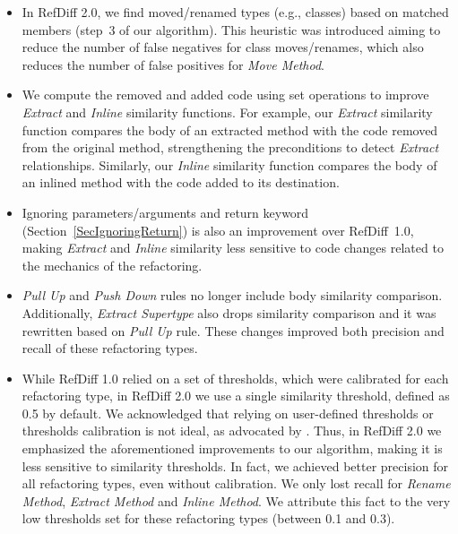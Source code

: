 \begin{itemize}
\item In RefDiff 2.0, we find moved/renamed types (e.g., classes) based on matched members (step~3 of our algorithm). This heuristic was introduced aiming to reduce the number of false negatives for class moves/renames, which also reduces the number of false positives for \emph{Move Method}.

\item We compute the removed and added code using set operations to improve \emph{Extract} and \emph{Inline} similarity functions. For example, our \emph{Extract} similarity function compares the body of an extracted method with the code removed from the original method, strengthening the preconditions to detect \emph{Extract} relationships. Similarly, our \emph{Inline} similarity function compares the body of an inlined method with the code added to its destination.

\item Ignoring parameters/arguments and return keyword (Section~\ref{SecIgnoringReturn}) is also an improvement over RefDiff~1.0, making \emph{Extract} and \emph{Inline} similarity less sensitive to code changes related to the mechanics of the refactoring.

\item \emph{Pull Up} and \emph{Push Down} rules no longer include body similarity comparison. Additionally, \emph{Extract Supertype} also drops similarity comparison and it was rewritten based on \emph{Pull Up} rule. These changes improved both precision and recall of these refactoring types.

\item While RefDiff 1.0 relied on a set of thresholds, which were calibrated for each refactoring type, in RefDiff 2.0 we use a single similarity threshold, defined as 0.5 by default.
We acknowledged that relying on user-defined thresholds or thresholds calibration is not ideal, as advocated by \cite{tsantalis2018rminer}.
Thus, in RefDiff 2.0 we emphasized the aforementioned improvements to our algorithm, making it is less sensitive to similarity thresholds.
In fact, we achieved better precision for all refactoring types, even without calibration.
We only lost recall for \emph{Rename Method}, \emph{Extract Method} and \emph{Inline Method}.
We attribute this fact to the very low thresholds set for these refactoring types (between 0.1 and 0.3).

\end{itemize}


